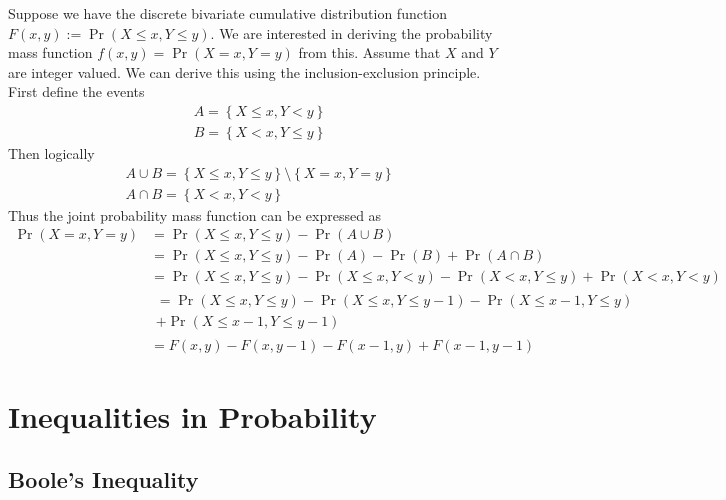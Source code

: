 \documentclass[11pt]{report} %
\begin{document}
Suppose we have the discrete bivariate cumulative distribution function $F\left(x, y\right) := \operatorname{Pr}\left(X\leq x, Y \leq y\right)$. We are interested in deriving the probability mass function $f\left(x, y\right) = \operatorname{Pr}\left(X = x, Y = y\right)$ from this. Assume that $X$ and $Y$ are integer valued. We can derive this using the inclusion-exclusion principle. First define the events
\begin{gather}
A = \left\{X \leq x, Y < y\right\} \\
B = \left\{X < x, Y \leq y\right\}
\end{gather}
Then logically
\begin{gather}
A \cup B =  \left\{X \leq x, Y \leq y\right\}\setminus\left\{X = x, Y = y\right\} \\
A \cap B = \left\{X < x, Y < y\right\}
\end{gather}
Thus the joint probability mass function can be expressed as
\begin{align}
\operatorname{Pr}\left(X = x, Y = y\right) &= \operatorname{Pr}\left(X \leq x, Y \leq y\right) - \operatorname{Pr}\left(A \cup B\right) \\
&= \operatorname{Pr}\left(X \leq x, Y \leq y\right) - \operatorname{Pr}\left(A\right) - \operatorname{Pr}\left(B\right) + \operatorname{Pr}\left(A \cap B\right) \\
&= \operatorname{Pr}\left(X \leq x, Y \leq y\right) - \operatorname{Pr}\left(X \leq x, Y < y\right) - \operatorname{Pr}\left(X < x, Y \leq y\right) + \operatorname{Pr}\left(X < x, Y < y\right) \\
&\begin{multlined} =\operatorname{Pr}\left(X \leq x, Y \leq y\right) - \operatorname{Pr}\left(X \leq x, Y \leq y - 1\right) - \operatorname{Pr}\left(X \leq x - 1, Y \leq y\right) \\
+ \operatorname{Pr}\left(X \leq x - 1, Y \leq y - 1\right) \end{multlined} \\
&= F\left(x, y\right) - F\left(x, y - 1\right) - F\left(x - 1, y\right) + F\left(x - 1, y - 1\right)
\end{align}
\section{Inequalities in Probability}

\subsection{Boole's Inequality}
\end{document}
